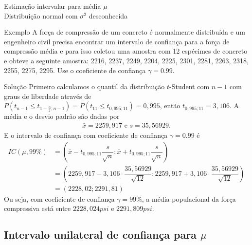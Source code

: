 \documentclass[8pt]{beamer}
\begin{document}
\begin{frame}{Estimação intervalar para média $\mu$\\ Distribuição normal com $\sigma^2$ desconhecida}

\small
	\begin{block}{Exemplo}
		A força de compressão de um concreto é normalmente distribuída e um engenheiro civil precisa encontrar um intervalo de confiança para a força de compressão média e para isso coletou uma amostra com 12 espécimes de concreto e obteve a seguinte amostra: 2216, 2237, 2249, 2204, 2225, 2301, 2281, 2263, 2318, 2255, 2275, 2295. Use o coeficiente de confiança $\gamma = 0.99$.
		
	\end{block}
	\vfill

	\begin{block}{Solução}
		Primeiro calculamos o quantil da distribuição $t$-Student com $n-1$ com graus de liberdade através de $P(t_{n-1} \leq t_{1-\frac{\alpha}{2};n-1} ) = P(t_{11} \leq t_{0,995;11}) = 0,995$, então $t_{0,995;11} = 3,106$. A média e o desvio padrão são dadas por
		\begin{align*}
			\bar{x} = 2259,917 \mbox{ e } s = 35,56929.
		\end{align*}
		E o intervalo de confiança com coeficiente de confiança $\gamma = 0.99$ é 
		\begin{align*}
			IC(\mu, 99\%) &= \left( \bar{x} - t_{0,995;11} \dfrac{s}{\sqrt{n}}; \bar{x} + t_{0,995;11} \dfrac{s}{\sqrt{n}}  \right)\\
			&= \left( 2259,917 - 3,106 \cdot \dfrac{35,56929}{\sqrt{12}}; 2259,917 + 3,106 \cdot \dfrac{35,56929}{\sqrt{12}} \right)\\
			&= (2228,02; 2291,81)
		\end{align*}
		Ou seja, com coeficiente de confiança $\gamma=99\%$, a média populacional da força compressiva está entre $2228,024psi$ e $2291,809psi$.
	\end{block}
\normalsize

\end{frame}

\subsection{Intervalo unilateral de confiança para $\mu$}
\end{document}
